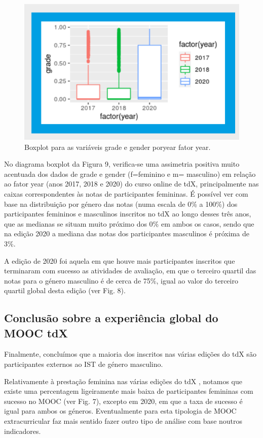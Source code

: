 \begin{figure}
    \centering
    \includegraphics[width=.9\textwidth]{chaps/Images/boxplot_grade_tdx.png}
    \caption{Boxplot para as variáveis grade e gender poryear fator year.}
    \label{fig:boxplot_gender_tdx}
\end{figure}

No diagrama boxplot da Figura 9, verifica-se uma assimetria positiva muito acentuada dos dados de grade e gender (f=feminino e m= masculino) em relação ao fator year (anos 2017, 2018 e 2020) do curso online de tdX, principalmente nas caixas correspondentes às notas de participantes femininas. É possível ver com base na distribuição por género
das notas (numa escala de 0\% a 100\%) dos
participantes femininos e masculinos inscritos no tdX ao longo desses três anos, que as medianas se situam muito próximo dos 0\% em ambos os casos, sendo que na edição 2020 a mediana das notas dos participantes masculinos é próxima de 3\%.

A edição de 2020 foi aquela em que houve mais participantes inscritos que terminaram com sucesso as atividades de avaliação, em que o terceiro quartil das notas para o género masculino é de cerca de 75\%, igual ao valor do terceiro quartil global desta edição (ver Fig. 8).

\subsection{Conclusão sobre a experiência global do MOOC tdX}

Finalmente, concluímos que a maioria dos inscritos nas várias edições do tdX são participantes externos ao IST de género masculino.

Relativamente à prestação feminina nas várias edições do tdX , notamos que existe uma percentagem ligeiramente mais baixa de participantes femininas com sucesso no
MOOC (ver Fig. 7), excepto em 2020, em que a taxa de sucesso é igual para ambos os géneros. Eventualmente para esta tipologia de MOOC extracurricular faz mais sentido fazer outro tipo de análise com base noutros indicadores.

